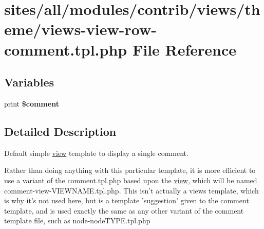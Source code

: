 \hypertarget{views-view-row-comment_8tpl_8php}{
\section{sites/all/modules/contrib/views/theme/views-view-row-comment.tpl.php File Reference}
\label{views-view-row-comment_8tpl_8php}
}
\subsection*{Variables}
\begin{CompactItemize}
\item 
\hypertarget{views-view-row-comment_8tpl_8php_c19d822a3ba2e8342528829eca49eb2e}{
print \textbf{\$comment}}
\label{views-view-row-comment_8tpl_8php_c19d822a3ba2e8342528829eca49eb2e}

\end{CompactItemize}


\subsection{Detailed Description}
Default simple \hyperlink{classview}{view} template to display a single comment.

Rather than doing anything with this particular template, it is more efficient to use a variant of the comment.tpl.php based upon the \hyperlink{classview}{view}, which will be named comment-view-VIEWNAME.tpl.php. This isn't actually a views template, which is why it's not used here, but is a template 'suggestion' given to the comment template, and is used exactly the same as any other variant of the comment template file, such as node-nodeTYPE.tpl.php 